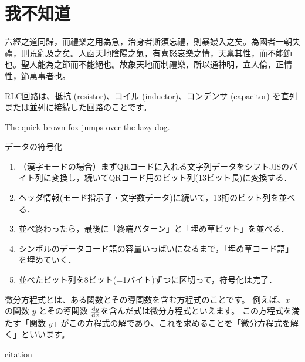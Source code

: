 \section{我不知道}

 {\genseki 六經之道同歸}，而禮樂之用為急，治身者斯須忘禮，則暴嫚入之矣。為國者一朝失禮，則荒亂及之矣。人函天地陰陽之氣，有喜怒哀樂之情，天禀其性，而不能節也。聖人能為之節而不能絕也。故象天地而制禮樂，所以通神明，立人倫，正情性，節萬事者也。

RLC回路は、抵抗 (resistor)、コイル (inductor)、コンデンサ (capacitor) を直列または並列に接続した回路のことです。

The quick brown fox jumps over the lazy dog.

データの符号化
\begin{enumerate}
	\item （漢字モードの場合）まずQRコードに入れる文字列データをシフトJISのバイト列に変換し，続いてQRコード用のビット列(13ビット長)に変換する．
	\item ヘッダ情報(モード指示子・文字数データ)に続いて，13桁のビット列を並べる．
	\item 並べ終わったら，最後に「終端パターン」と「埋め草ビット」を並べる．
	\item シンボルのデータコード語の容量いっぱいになるまで，「埋め草コード語」を埋めていく．
	\item 並べたビット列を8ビット(=1バイト)ずつに区切って，符号化は完了．
\end{enumerate}

微分方程式とは、ある関数とその導関数を含む方程式のことです。
例えば、\(x\) の関数 \(y\) とその導関数 \(\dv{y}{x}\)を含んだ式は微分方程式といえます。
この方程式を満たす「関数 \(y\)」がこの方程式の解であり、これを求めることを「微分方程式を解く」といいます。

citation \cite{sizesuu}
